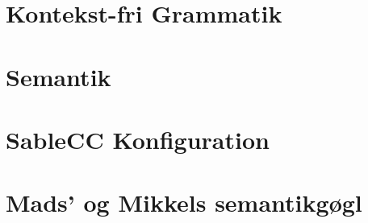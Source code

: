 \appendix


\chapter{Kontekst-fri Grammatik}
\label{bil:cfg}


\label{FIRSTAPPENDIX} %

\chapter{Semantik}
\label{bil:semantik}


\chapter{SableCC Konfiguration}
\label{bil:sablecc}


\chapter{Mads' og Mikkels semantikgøgl}
\label{bil:temp}



%

%

\label{LASTAPPENDIX}
